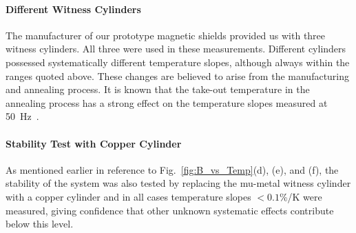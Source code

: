 

\paragraph{Different Witness Cylinders}
The manufacturer of our prototype magnetic shields provided us with
three witness cylinders.  All three were used in these measurements.
Different cylinders possessed systematically different temperature
slopes, although always within the ranges quoted above.  These changes
are believed to arise from the manufacturing and annealing process.
It is known that the take-out temperature in the annealing process has
a strong effect on the temperature slopes measured at
50~Hz~\cite{kruppvdm}.




\paragraph{Stability Test with Copper Cylinder}
As mentioned earlier in reference to Fig.~\ref{fig:B_vs_Temp}(d), (e),
and (f), the stability of the system was also tested by replacing the
mu-metal witness cylinder with a copper cylinder and in all cases
temperature slopes $<0.1$\%/K were measured, giving confidence that
other unknown systematic effects contribute below this level.

